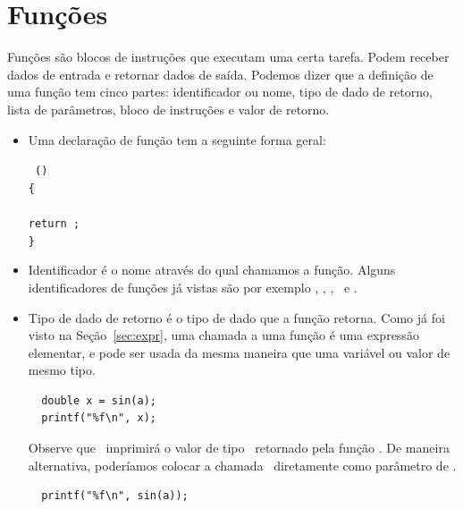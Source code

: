 \chapter{Funções}

Funções são blocos de instruções que executam uma certa tarefa. 
Podem receber dados de entrada e retornar dados de saída. 
Podemos dizer que a definição de uma função tem cinco partes: identificador ou nome, tipo de dado de retorno, lista de parâmetros, bloco de instruções e valor de retorno.

\begin{itemize}

\item Uma declaração de função tem a seguinte forma geral:

{\tt
{}  ()\\
\{\\
\TAB {}\\
\TAB return ;\\
\}\\
}

\item Identificador é o nome através do qual chamamos a função. Alguns identificadores de funções já vistas são por exemplo \PRINTF, \SCANF, \FGETS, \SIN\ e \COS.

\item Tipo de dado de retorno é o tipo de dado que a função retorna. Como já foi visto na Seção~\ref{sec:expr}, uma chamada a uma função é uma expressão elementar, e pode ser usada da mesma maneira que uma variável ou valor de mesmo tipo.

\begin{lstlisting}
  double x = sin(a);
  printf("%f\n", x);
\end{lstlisting}

  Observe que \PRINTF\ imprimirá o valor de tipo \DOUBLE\ retornado pela função \SIN. De maneira alternativa, poderíamos colocar a chamada \SIN\ diretamente como parâmetro de \PRINTF.

\begin{lstlisting}
  printf("%f\n", sin(a));
\end{lstlisting}


\end{itemize}
